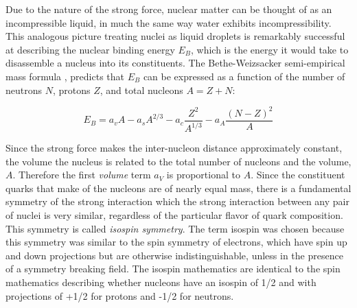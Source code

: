 Due to the nature of the strong force, nuclear matter can be thought of as an incompressible liquid, in much the same way water exhibits incompressibility. This analogous picture treating nuclei as liquid droplets is remarkably successful at describing the nuclear binding energy $E_{B}$, which is the energy it would take to disassemble a nucleus into its constituents. The Bethe-Weizsacker semi-empirical mass formula \cite{awayforward}, predicts that $E_{B}$ can be expressed as a function of the number of neutrons $N$, protons $Z$, and total nucleons $A = Z + N$:
 
\begin{equation}
E_{B} = a_vA - a_s A^{2/3} - a_c \frac{Z^2}{A^{1/3}} - a_A \frac{(N - Z)^2}{A}
\label{eq:semiEmp}
\end{equation}

Since the strong force makes the inter-nucleon distance approximately constant, the volume the nucleus is related to the total number of nucleons and the volume, $A$. Therefore the first \emph{volume} term $a_V$ is proportional to $A$. Since the  constituent quarks that make of the nucleons are of nearly equal mass, there is a fundamental symmetry of the strong interaction which the strong interaction between any pair of nuclei is very similar, regardless of the particular flavor of quark composition. This symmetry is called \emph{isospin symmetry}. The term isospin was chosen because this symmetry was similar to the spin symmetry of electrons, which have spin up and down projections but are otherwise indistinguishable, unless in the presence of a symmetry breaking field.  The isospin mathematics are identical to the spin mathematics describing whether nucleons have an isospin of 1/2 and with projections of  +1/2 for protons and -1/2 for neutrons. 

